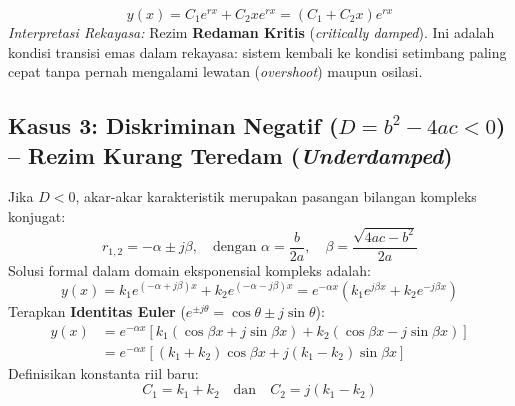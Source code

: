 \documentclass[11pt,a4paper]{article}
\theoremstyle{definition}
\begin{document}
\begin{tcolorbox}[colback=green!5!white,colframe=green!60!black,title=\textbf{Solusi Umum Kasus 2 (Akar Real Kembar)}]
\begin{equation}
    y(x) = C_1 e^{rx} + C_2 x e^{rx} = \left( C_1 + C_2 x \right) e^{rx}
    \label{eq:sol_critically_damped}
\end{equation}
\textit{Interpretasi Rekayasa:} Rezim \textbf{Redaman Kritis} (\textit{critically damped}). Ini adalah kondisi transisi emas dalam rekayasa: sistem kembali ke kondisi setimbang paling cepat tanpa pernah mengalami lewatan (\textit{overshoot}) maupun osilasi.
\end{tcolorbox}

\subsection{Kasus 3: Diskriminan Negatif (\texorpdfstring{$D = b^2 - 4ac < 0$}{D < 0}) -- Rezim Kurang Teredam (\textit{Underdamped})}

Jika $D < 0$, akar-akar karakteristik merupakan pasangan bilangan kompleks konjugat:
\begin{equation}
    r_{1,2} = -\alpha \pm j \beta, \quad \text{dengan } \alpha = \frac{b}{2a}, \quad \beta = \frac{\sqrt{4ac - b^2}}{2a}
    \label{eq:complex_roots}
\end{equation}
Solusi formal dalam domain eksponensial kompleks adalah:
\begin{equation}
    y(x) = k_1 e^{(-\alpha + j\beta)x} + k_2 e^{(-\alpha - j\beta)x} = e^{-\alpha x} \left( k_1 e^{j\beta x} + k_2 e^{-j\beta x} \right)
\end{equation}
Terapkan \textbf{Identitas Euler} ($e^{\pm j\theta} = \cos\theta \pm j\sin\theta$):
\begin{align*}
    y(x) &= e^{-\alpha x} \left[ k_1 (\cos\beta x + j\sin\beta x) + k_2 (\cos\beta x - j\sin\beta x) \right] \\
    &= e^{-\alpha x} \left[ (k_1 + k_2) \cos\beta x + j(k_1 - k_2) \sin\beta x \right]
\end{align*}
Definisikan konstanta riil baru:
\begin{equation}
    C_1 = k_1 + k_2 \quad \text{dan} \quad C_2 = j(k_1 - k_2)
\end{equation}
\end{document}

